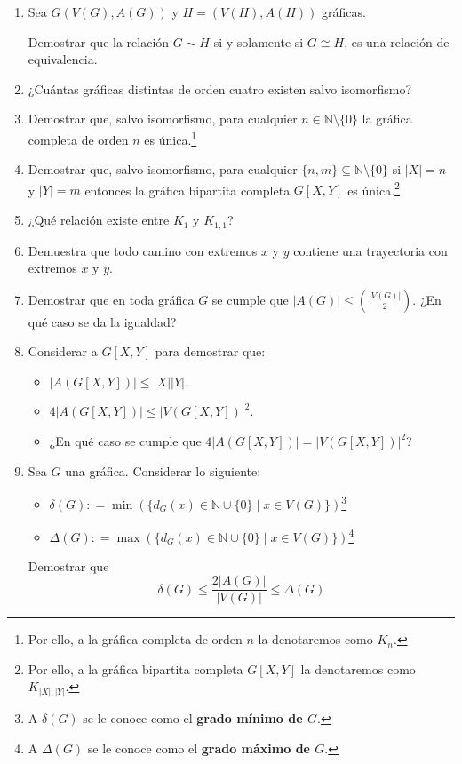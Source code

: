 \documentclass[10pt]{report}
\numberwithin{section}{chapter}
\newcommand{\N}{\mathbb N}
\begin{document}
\begin{enumerate}
\item Sea $G(V(G), A(G))$ y $H=(V(H), A(H))$ gráficas.

Demostrar que la relación $G \sim H$ si y solamente si $G \cong H$, es una relación de equivalencia.

\item ¿Cuántas gráficas distintas de orden cuatro existen salvo isomorfismo?

\item Demostrar que, salvo isomorfismo, para cualquier $n \in \N \setminus\{0\}$ la gráfica completa de orden $n$ es única.\footnote{Por ello, a la gráfica completa de orden $n$ la denotaremos como $K_n$.}

\item Demostrar que, salvo isomorfismo, para cualquier $\{n,m\} \subseteq \N \setminus\{0\}$ si $|X| = n$ y $|Y|=m$ entonces la gráfica bipartita completa $G[X,Y]$ es única.\footnote{Por ello, a la gráfica bipartita completa $G[X,Y]$ la denotaremos como $K_{|X|,|Y|}$.}


\item ¿Qué relación existe entre $K_1$ y $K_{1,1}$?

\item Demuestra que todo camino con extremos $x$ y $y$ contiene una trayectoria con extremos $x$ y $y$.

\item Demostrar que en toda gráfica $G$ se cumple que $|A(G)| \leq {|V(G)|\choose 2}$. ¿En qué caso se da la igualdad?

\item Considerar a $G[X,Y]$ para demostrar que:
\begin{itemize}
\item $|A(G[X,Y])| \leq |X||Y|$.
\item $4 |A(G[X,Y])| \leq |V(G[X,Y])|^2$.
\item ¿En qué caso se cumple que $4 |A(G[X,Y])| = |V(G[X,Y])|^2$?
\end{itemize}

\item Sea $G$ una gráfica. Considerar lo siguiente:
\begin{itemize}
\item $\delta (G) : = \min(\{d_G(x) \in \N \cup \{0\} \; | \; x \in V(G) \})$\footnote{A $\delta(G)$ se le conoce como el \textbf{grado mínimo de $G$}.}
\item $\Delta (G) : = \max(\{d_G(x) \in \N \cup \{0\} \; | \; x \in V(G) \})$\footnote{A $\Delta(G)$ se le conoce como el \textbf{grado máximo de $G$}.}
\end{itemize}
Demostrar que $$ \delta(G) \leq \frac{2 |A(G)|}{|V(G)|} \leq \Delta(G)$$


\end{enumerate}
\end{document}
